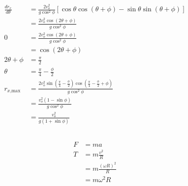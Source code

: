 \documentclass{article}
\begin{document}
\begin{align*}
  \frac{d r_x}{d \theta} & = \frac{2 v_o^2}{g \cos^2 \phi} [\cos \theta \cos (\theta + \phi) - \sin \theta \sin (\theta + \phi)]                                        \\
                         & = \frac{2 v_o^2 \cos (2 \theta + \phi)}{g \cos^2 \phi}                                                                                       \\
  0                      & = \frac{2 v_o^2 \cos (2 \theta + \phi)}{g \cos^2 \phi}                                                                                       \\
                         & = \cos (2 \theta + \phi)                                                                                                                     \\
  2 \theta + \phi        & = \frac{\pi}{2}                                                                                                                              \\
  \theta                 & = \frac{\pi}{4} - \frac{\phi}{2}                                                                                                             \\
  r_{x\text{,max}}       & = \frac{2 v_o^2 \sin \left( \frac{\pi}{4} - \frac{\phi}{2} \right) \cos \left( \frac{\pi}{4} - \frac{\phi}{2} + \phi \right)}{g \cos^2 \phi} \\
                         & = \frac{v_o^2 (1 - \sin \phi)}{g \cos^2 \phi}                                                                                                \\
                         & = \frac{v_o^2}{g (1 + \sin \phi)}
\end{align*}

\setcounter{subsection}{40}
\subsection{}

\begin{align*}
  F & = m a                      \\
  T & = m \frac{v^2}{R}          \\
    & = m \frac{(\omega R)^2}{R} \\
    & = m \omega^2 R
\end{align*}

\setcounter{subsection}{46}
\subsection{}
\end{document}
